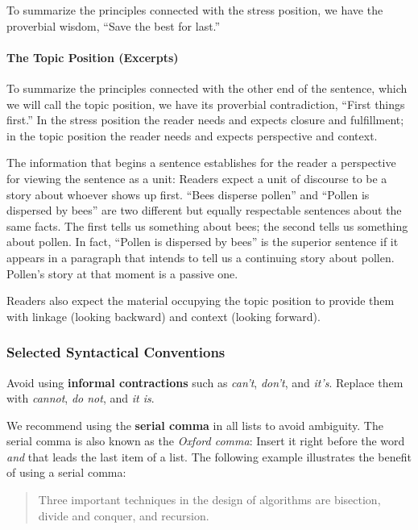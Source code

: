 To summarize the principles connected with the stress position, we have the proverbial wisdom, “Save the best for last.”

\paragraph{The Topic Position (Excerpts)}

To summarize the principles connected with the other end of the sentence, which we will call the topic position, we have its proverbial contradiction, “First things first.”
In the stress position the reader needs and expects closure and fulfillment; in the topic position the reader needs and expects perspective and context.

The information that begins a sentence establishes for the reader a perspective for viewing the sentence as a unit: Readers expect a unit of discourse to be a story about whoever shows up first. “Bees disperse pollen” and “Pollen is dispersed by bees” are two different but equally respectable sentences about the same facts. The first tells us something about bees; the second tells us something about pollen. In fact, “Pollen is dispersed by bees” is the superior sentence if it appears in a paragraph that intends to tell us a continuing story about pollen. Pollen’s story at that moment is a passive one.

Readers also expect the material occupying the topic position to provide them with linkage (looking backward) and context (looking forward).

\subsubsection{Selected Syntactical Conventions}

Avoid using \textbf{informal contractions} such as \emph{can't}, \emph{don't}, and \emph{it's}. Replace them with \emph{cannot}, \emph{do not}, and \emph{it is}.

We recommend using the \textbf{serial comma} in all lists to avoid ambiguity. The serial comma is also known as the \emph{Oxford comma}: Insert  it right before the word \emph{and} that leads the last item of a list. The following example%
illustrates the benefit of using a serial comma:
\begin{quote}
  Three important techniques in the design of algorithms are bisection, divide and conquer, and recursion.
\end{quote}

